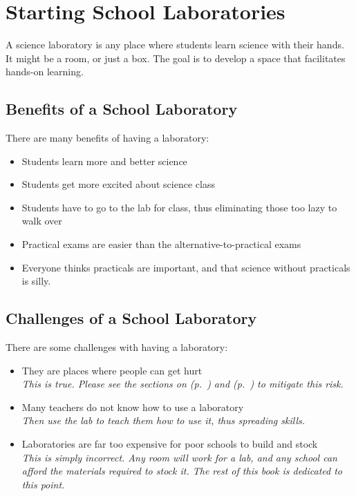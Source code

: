 \chapter{Starting School Laboratories} 

A science laboratory is any place 
where students learn science with their hands. 
It might be a room, 
or just a box. 
The goal is to develop a space that facilitates hands-on learning.

\section{Benefits of a School Laboratory}
There are many benefits of having a laboratory:
\begin{itemize}
\item{Students learn more and better science}
\item{Students get more excited about science class}
\item{Students have to go to the lab for class, 
thus eliminating those too lazy to walk over}
\item{Practical exams are easier than the alternative-to-practical exams}
\item{Everyone thinks practicals are important, 
and that science without practicals is silly.}
\end{itemize}

\section{Challenges of a School Laboratory}
There are some challenges with having a laboratory:
\begin{itemize}
\item{They are places where people can get hurt\\
\textit{This is true. 
Please see the sections on  (p.~\pageref{cha:classmanagement}) and  (p.~\pageref{cha:labsafety})
to mitigate this risk.}}
\item{Many teachers do not know how to use a laboratory\\
\textit{Then use the lab to teach them how to use it, thus spreading skills.}}
\item{Laboratories are far too expensive for poor schools to build and stock\\
\textit{This is simply incorrect. 
Any room will work for a lab, 
and any school can afford the materials required to stock it. 
The rest of this book is dedicated to this point.}}
\end{itemize}

